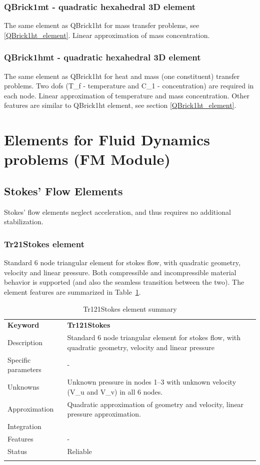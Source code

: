 \documentclass[a4paper]{article}
\newcommand{\param}[1]{\texttt{#1}} %
\newcommand{\templabel}{}%
\newcommand{\tempcaption}{}%
\newcounter{nelpar}
\newenvironment{elementsummary}[5]{%
  \gdef\tempcaption{#4}%
  \gdef\templabel{#5}%
  \setcounter{nelpar}{0}%
  \begin{center} %
    \begin{table}[!htb] %
      \begin{tabular}{|l|p{9cm}|}\hline %
        {\bf Keyword} & \bf{#1}\\ %
        {Description} & {#2}\\ %
        {Specific parameters} & {#3}\\ \hline %
}{
  \\ \hline %
      \end{tabular}%
      \caption{\tempcaption}%
      \label{\templabel}%
    \end{table}%
  \end{center}%
}
\newcommand{\elementParam}[1]{%
  \ifthenelse{\value{nelpar}>0} %
             {&{#1}}%
             {\setcounter{nelpar}{1}Parameters&{#1}}%
             \\%
}
\newcommand{\elementDescription}[2]{{#1} & {#2}\\}
\begin{document}
\subsubsection{QBrick1mt - quadratic hexahedral 3D element}
The same element as QBrick1ht for mass transfer problems, see \ref{QBrick1ht_element}. 
Linear approximation of mass concentration.

\subsubsection{QBrick1hmt - quadratic hexahedral 3D element}
The same element as QBrick1ht for
heat and mass (one constituent) transfer problems. 
Two dofs (T\_f - temperature and C\_1 - concentration) are required in
each node. Linear approximation of temperature and mass concentration.
Other features are similar to QBrick1ht element, see section \ref{QBrick1ht_element}.


\clearpage
\section{Elements for Fluid Dynamics problems (FM Module)}
\subsection{Stokes' Flow Elements}
Stokes' flow elements neglect acceleration, and thus requires no additional stabilization.

\subsubsection{Tr21Stokes element}
Standard 6 node triangular element for stokes flow, with quadratic geometry, velocity and linear pressure.
Both compressible and incompressible material behavior is supported (and also the seamless transition between the two).
The element features are summarized in Table~\ref{Tr121Stokessummary}.

\begin{elementsummary}{Tr121Stokes}{Standard 6 node triangular element for stokes flow, with quadratic geometry, velocity and linear pressure}{-}{Tr121Stokes element summary}{Tr121Stokessummary}
\elementDescription{Unknowns}{Unknown pressure in nodes 1--3 with unknown velocity (V\_u and V\_v) in all 6 nodes.}
\elementDescription{Approximation}{Quadratic approximation of geometry and velocity, linear pressure approximation.}
\elementDescription{Integration}{}
\elementDescription{Features}{-}
\elementDescription{Status}{Reliable}
\end{elementsummary}
\end{document}
